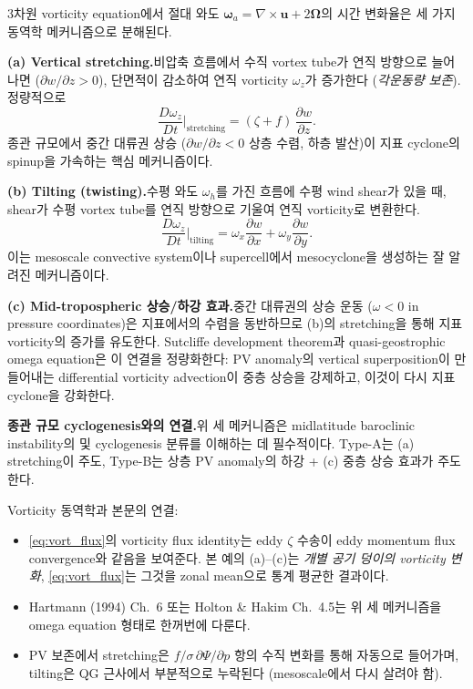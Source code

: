\begin{example}\label{ex:ch04_hw7_vorticity}
3차원 vorticity equation에서 절대 와도 $\bm{\omega}_a = \nabla\times\mathbf{u} + 2\bm{\Omega}$의
시간 변화율은 세 가지 동역학 메커니즘으로 분해된다.

\smallskip
\textbf{(a) Vertical stretching.}\quad 비압축 흐름에서 수직 vortex tube가
연직 방향으로 늘어나면 ($\partial w/\partial z > 0$), 단면적이 감소하여
연직 vorticity $\omega_z$가 증가한다 (\emph{각운동량 보존}).
정량적으로
\[
  \frac{D\omega_z}{Dt}\bigg|_{\text{stretching}}
  = (\zeta + f)\,\frac{\partial w}{\partial z}.
\]
종관 규모에서 중간 대류권 상승 ($\partial w/\partial z < 0$ 상층 수렴, 하층 발산)이
지표 cyclone의 spinup을 가속하는 핵심 메커니즘이다.

\smallskip
\textbf{(b) Tilting (twisting).}\quad 수평 와도 $\omega_h$를 가진
흐름에 수평 wind shear가 있을 때, shear가 수평 vortex tube를
연직 방향으로 기울여 연직 vorticity로 변환한다.
\[
  \frac{D\omega_z}{Dt}\bigg|_{\text{tilting}}
  = \omega_x\frac{\partial w}{\partial x} + \omega_y\frac{\partial w}{\partial y}.
\]
이는 mesoscale convective system이나 supercell에서 mesocyclone을
생성하는 잘 알려진 메커니즘이다.

\smallskip
\textbf{(c) Mid-tropospheric 상승/하강 효과.}\quad 중간 대류권의
상승 운동 ($\omega < 0$ in pressure coordinates)은
지표에서의 수렴을 동반하므로 (b)의 stretching을 통해 지표 vorticity의
증가를 유도한다.  Sutcliffe development theorem과 quasi-geostrophic
omega equation은 이 연결을 정량화한다: PV anomaly의 vertical
superposition이 만들어내는 differential vorticity advection이
중층 상승을 강제하고, 이것이 다시 지표 cyclone을 강화한다.

\smallskip
\textbf{종관 규모 cyclogenesis와의 연결.}\quad 위 세 메커니즘은
midlatitude baroclinic instability의 
및  cyclogenesis 분류를 이해하는 데 필수적이다.
Type-A는 (a) stretching이 주도, Type-B는 상층 PV anomaly의
하강 + (c) 중층 상승 효과가 주도한다.
\end{example}

\begin{hisublock}
Vorticity 동역학과 본문의 연결:
\begin{itemize}
  \item \eqref{eq:vort_flux}의 vorticity flux identity는 eddy $\zeta$ 수송이
        eddy momentum flux convergence와 같음을 보여준다.  본 예의
        (a)--(c)는 \emph{개별 공기 덩이의 vorticity 변화}, \eqref{eq:vort_flux}는
        그것을 zonal mean으로 통계 평균한 결과이다.
  \item Hartmann (1994) Ch.~6 또는 Holton \& Hakim Ch.~4.5는 위 세 메커니즘을
        omega equation 형태로 한꺼번에 다룬다.
  \item PV 보존에서 stretching은 $f/\sigma\,\partial\Psi/\partial p$ 항의 수직
        변화를 통해 자동으로 들어가며, tilting은 QG 근사에서 부분적으로 누락된다
        (mesoscale에서 다시 살려야 함).
\end{itemize}
\end{hisublock}

